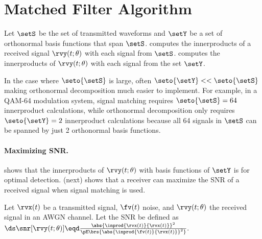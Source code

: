\section{Matched Filter Algorithm}

Let $\setS$ be the set of transmitted waveforms and
$\setY$ be a set of orthonormal basis functions that span $\setS$.
 computes the innerproducts of a
received signal $\rvy(t;\theta)$ with each signal from $\setS$.
 computes the innerproducts of
$\rvy(t;\theta)$ with each signal from the set $\setY$.

In the case where $\seto{\setS}$ is large, often $\seto{\setY}<<\seto{\setS}$
making orthonormal decomposition much easier to implement.
For example, in a QAM-64 modulation system,
signal matching requires $\seto{\setS}=64$ innerproduct calculations,
while orthonormal decomposition only requires $\seto{\setY}=2$
innerproduct calculations because all 64 signals in $\setS$ can be spanned
by just 2 orthonormal basis functions.

\paragraph{Maximizing SNR.}
 shows that the innerproducts of $\rvy(t;\theta)$ with
basis functions of $\setY$ is  for optimal detection.
 (next) shows that a receiver can
maximize the SNR of a received signal when signal matching is used.

\begin{theorem}
\label{thm:mf_maxSNR}
Let $\rvx(t)$ be a transmitted signal, $\fv(t)$ noise, and $\rvy(t;\theta)$ the received signal
in an AWGN channel.
Let the  SNR be defined as
\\\indentx$\ds
      \snr[\rvy(t;\theta)] \eqd \frac{\abs{\inprod{\rvx(t)}{\rvx(t)}}^2}
                            {\pE\brs{\abs{\inprod{\fv(t)}{\rvx(t)}}^2}}.
          $
\end{theorem}

